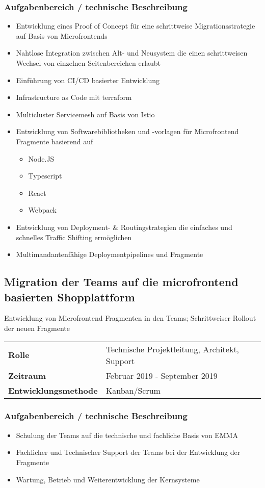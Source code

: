 \documentclass[10pt,ngerman,a4paper]{article}
\begin{document}
\subsubsection{Aufgabenbereich / technische Beschreibung}
\begin{itemize}
\item Entwicklung eines Proof of Concept für eine schrittweise Migrationsstrategie auf Basis von Microfrontends
\item Nahtlose Integration zwischen Alt- und Neusystem die einen schrittweisen Wechsel von einzelnen Seitenbereichen erlaubt
\item Einführung von CI/CD basierter Entwicklung
\item Infrastructure as Code mit terraform
\item Multicluster Servicemesh auf Basis von Istio
\item Entwicklung von Softwarebibliotheken und -vorlagen für Microfrontend Fragmente basierend auf
\begin{itemize}
\item Node.JS
\item Typescript
\item React
\item Webpack
\end{itemize}
\item Entwicklung von Deployment- \& Routingstrategien die einfaches und schnelles Traffic Shifting ermöglichen
\item Multimandantenfähige Deploymentpipelines und Fragmente
\end{itemize}

\subsection{Migration der Teams auf die microfrontend basierten Shopplattform}
Entwicklung von Microfrontend Fragmenten in den Teams; Schrittweiser Rollout 
der neuen Fragmente

\begin{tabular}{ll}
\textbf{Rolle} & Technische Projektleitung, Architekt, Support \\
\textbf{Zeitraum} & Februar 2019 - September 2019\\
\textbf{Entwicklungsmethode} & Kanban/Scrum
\end{tabular}

\subsubsection{Aufgabenbereich / technische Beschreibung}
\begin{itemize}
\item Schulung der Teams auf die technische und fachliche Basis von EMMA
\item Fachlicher und Technischer Support der Teams bei der Entwicklung der Fragmente
\item Wartung, Betrieb und Weiterentwicklung der Kernsysteme
\end{itemize}
\end{document}
